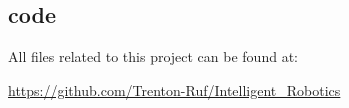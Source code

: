 \documentclass[11pt]{scrartcl} %
\begin{document}
\subsection{code}

All files related to this project can be found at:

\url{https://github.com/Trenton-Ruf/Intelligent_Robotics}


\clearpage
\medskip

{}

\end{document}
